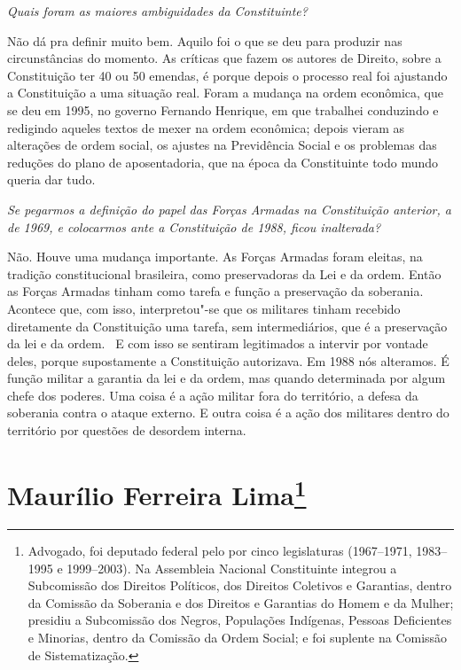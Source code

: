 \medskip

\noindent\emph{Quais foram as maiores ambiguidades da Constituinte?}

Não dá pra definir muito bem. Aquilo foi o que se deu
para produzir nas circunstâncias do momento. As críticas que fazem os
autores de Direito, sobre a Constituição ter 40 ou 50 emendas, é porque
depois o processo real foi ajustando a Constituição a uma situação real.
Foram a mudança na ordem econômica, que se deu em 1995, no governo
Fernando Henrique, em que trabalhei conduzindo e redigindo aqueles
textos de mexer na ordem econômica; depois vieram as alterações de ordem
social, os ajustes na Previdência Social e os problemas das reduções do
plano de aposentadoria, que na época da Constituinte todo mundo queria
dar tudo.

\medskip

\noindent\emph{Se pegarmos a definição do papel das Forças Armadas na Constituição
anterior, a de 1969, e colocarmos ante a Constituição de 1988, ficou
inalterada?}

Não. Houve uma mudança importante. As Forças Armadas
foram eleitas, na tradição constitucional brasileira, como preservadoras
da Lei e da ordem. Então as Forças Armadas tinham como tarefa e função a
preservação da soberania. Acontece que, com isso, interpretou"-se que os
militares tinham recebido diretamente da Constituição uma tarefa, sem
intermediários, que é a preservação da lei e da ordem.~ E com isso se
sentiram legitimados a intervir por vontade deles, porque supostamente a
Constituição autorizava. Em 1988 nós alteramos. É função militar a
garantia da lei e da ordem, mas quando determinada por algum chefe dos
poderes. Uma coisa é a ação militar fora do território, a defesa da
soberania contra o ataque externo. E outra coisa é a ação dos militares
dentro do território por questões de desordem interna.

\chapter{Maurílio Ferreira Lima\footnote{Advogado, foi deputado federal pelo  por cinco legislaturas
(1967--1971, 1983--1995 e 1999--2003). Na Assembleia Nacional Constituinte
integrou a Subcomissão dos Direitos Políticos, dos Direitos Coletivos e
Garantias, dentro da Comissão da Soberania e dos Direitos e Garantias do
Homem e da Mulher; presidiu a Subcomissão dos Negros, Populações
Indígenas, Pessoas Deficientes e Minorias, dentro da Comissão da Ordem
Social; e foi suplente na Comissão de Sistematização.}}

